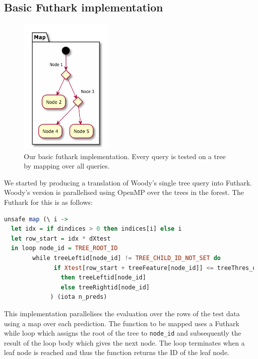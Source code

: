 \documentclass[a4paper]{article}
\begin{document}
\subsection{Basic Futhark implementation}


\begin{figure}
\centering
\includegraphics[width=0.4\textwidth]{tree_basic}
\caption{\label{fig:frog2}Our basic futhark implementation. Every query is tested on a tree by mapping over all queries.}
\end{figure}

We started by producing a translation of Woody's single tree query into Futhark. Woody's version is parallelised using OpenMP over the trees in the forest. The Futhark for this is as follows:

\vspace{1ex}
\begin{lrbox}{\lstbox}
\begin{minipage}{\textwidth}
\begin{lstlisting}[language=Haskell, breaklines]
  unsafe map (\ i ->
  let idx = if dindices > 0 then indices[i] else i
  let row_start = idx * dXtest
  in loop node_id = TREE_ROOT_ID
        while treeLeftid[node_id] != TREE_CHILD_ID_NOT_SET do
              if Xtest[row_start + treeFeature[node_id]] <= treeThres_or_leaf[node_id]
                then treeLeftid[node_id]
                else treeRightid[node_id]
             ) (iota n_preds)
\end{lstlisting}
\end{minipage}
\end{lrbox}
\vspace{1ex}

\colorbox{lightgray}{\usebox\lstbox}

This implementation parallelises the evaluation over the rows of the test data using a map over each prediction. The function to be mapped uses a Futhark while loop which assigns the root of the tree to \texttt{node\_id} and subsequently the result of the loop body which gives the next node. The loop terminates when a leaf node is reached and thus the function returns the ID of the leaf node.
\end{document}
